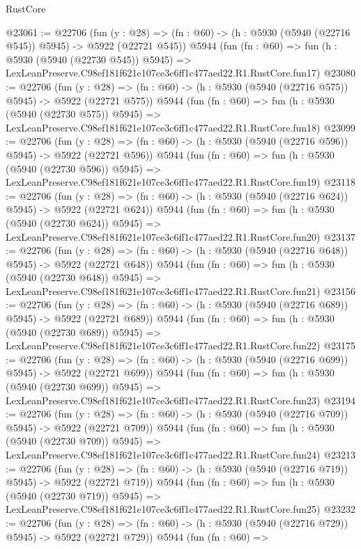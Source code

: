 \begin{lexlean}{RustCore}
\begin{coremodule}
@23061 := @22706
    (fun (y : @28) => (fn : @60) -> (h : @5930 (@5940 (@22716 @545)) @5945) -> @5922 (@22721 @545))
    @5944
    (fun (fn : @60) =>
    fun (h : @5930 (@5940 (@22730 @545)) @5945) =>
    LexLeanPreserve.C98ef181f621e107ce3c6ff1c477aed22.R1.RustCore.fun17)
@23080 := @22706
    (fun (y : @28) => (fn : @60) -> (h : @5930 (@5940 (@22716 @575)) @5945) -> @5922 (@22721 @575))
    @5944
    (fun (fn : @60) =>
    fun (h : @5930 (@5940 (@22730 @575)) @5945) =>
    LexLeanPreserve.C98ef181f621e107ce3c6ff1c477aed22.R1.RustCore.fun18)
@23099 := @22706
    (fun (y : @28) => (fn : @60) -> (h : @5930 (@5940 (@22716 @596)) @5945) -> @5922 (@22721 @596))
    @5944
    (fun (fn : @60) =>
    fun (h : @5930 (@5940 (@22730 @596)) @5945) =>
    LexLeanPreserve.C98ef181f621e107ce3c6ff1c477aed22.R1.RustCore.fun19)
@23118 := @22706
    (fun (y : @28) => (fn : @60) -> (h : @5930 (@5940 (@22716 @624)) @5945) -> @5922 (@22721 @624))
    @5944
    (fun (fn : @60) =>
    fun (h : @5930 (@5940 (@22730 @624)) @5945) =>
    LexLeanPreserve.C98ef181f621e107ce3c6ff1c477aed22.R1.RustCore.fun20)
@23137 := @22706
    (fun (y : @28) => (fn : @60) -> (h : @5930 (@5940 (@22716 @648)) @5945) -> @5922 (@22721 @648))
    @5944
    (fun (fn : @60) =>
    fun (h : @5930 (@5940 (@22730 @648)) @5945) =>
    LexLeanPreserve.C98ef181f621e107ce3c6ff1c477aed22.R1.RustCore.fun21)
@23156 := @22706
    (fun (y : @28) => (fn : @60) -> (h : @5930 (@5940 (@22716 @689)) @5945) -> @5922 (@22721 @689))
    @5944
    (fun (fn : @60) =>
    fun (h : @5930 (@5940 (@22730 @689)) @5945) =>
    LexLeanPreserve.C98ef181f621e107ce3c6ff1c477aed22.R1.RustCore.fun22)
@23175 := @22706
    (fun (y : @28) => (fn : @60) -> (h : @5930 (@5940 (@22716 @699)) @5945) -> @5922 (@22721 @699))
    @5944
    (fun (fn : @60) =>
    fun (h : @5930 (@5940 (@22730 @699)) @5945) =>
    LexLeanPreserve.C98ef181f621e107ce3c6ff1c477aed22.R1.RustCore.fun23)
@23194 := @22706
    (fun (y : @28) => (fn : @60) -> (h : @5930 (@5940 (@22716 @709)) @5945) -> @5922 (@22721 @709))
    @5944
    (fun (fn : @60) =>
    fun (h : @5930 (@5940 (@22730 @709)) @5945) =>
    LexLeanPreserve.C98ef181f621e107ce3c6ff1c477aed22.R1.RustCore.fun24)
@23213 := @22706
    (fun (y : @28) => (fn : @60) -> (h : @5930 (@5940 (@22716 @719)) @5945) -> @5922 (@22721 @719))
    @5944
    (fun (fn : @60) =>
    fun (h : @5930 (@5940 (@22730 @719)) @5945) =>
    LexLeanPreserve.C98ef181f621e107ce3c6ff1c477aed22.R1.RustCore.fun25)
@23232 := @22706
    (fun (y : @28) => (fn : @60) -> (h : @5930 (@5940 (@22716 @729)) @5945) -> @5922 (@22721 @729))
    @5944
    (fun (fn : @60) =>

\end{coremodule}
\end{lexlean}
